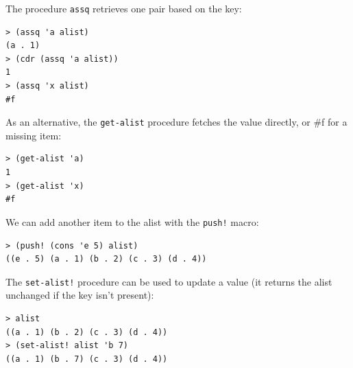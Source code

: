 \documentclass[twoside,9pt]{report}
\begin{document}
The procedure \texttt{assq} retrieves one pair based on the key:

\noindent\makebox[\linewidth]{\rule{\linewidth}{0.4pt}}
\begin{lstlisting}
> (assq 'a alist)
(a . 1)
> (cdr (assq 'a alist))
1
> (assq 'x alist)
#f
\end{lstlisting}
\noindent\makebox[\linewidth]{\rule{\linewidth}{0.4pt}}

As an alternative, the \texttt{get-alist} procedure fetches the value directly, or \#f for a missing item:

\noindent\makebox[\linewidth]{\rule{\linewidth}{0.4pt}}
\begin{lstlisting}
> (get-alist 'a)
1
> (get-alist 'x)
#f
\end{lstlisting}
\noindent\makebox[\linewidth]{\rule{\linewidth}{0.4pt}}

We can add another item to the alist with the \texttt{push!} macro:

\noindent\makebox[\linewidth]{\rule{\linewidth}{0.4pt}}
\begin{lstlisting}
> (push! (cons 'e 5) alist)
((e . 5) (a . 1) (b . 2) (c . 3) (d . 4))
\end{lstlisting}
\noindent\makebox[\linewidth]{\rule{\linewidth}{0.4pt}}

The \texttt{set-alist!} procedure can be used to update a value (it returns the alist unchanged if the key isn't present):

\noindent\makebox[\linewidth]{\rule{\linewidth}{0.4pt}}
\begin{lstlisting}
> alist
((a . 1) (b . 2) (c . 3) (d . 4))
> (set-alist! alist 'b 7)
((a . 1) (b . 7) (c . 3) (d . 4))
\end{lstlisting}
\noindent\makebox[\linewidth]{\rule{\linewidth}{0.4pt}}
\end{document}
